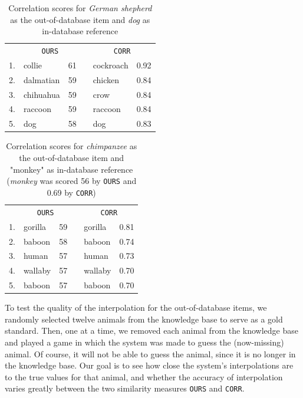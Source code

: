 \documentclass[11pt,a4paper]{article}
\begin{document}
\begin{table}[h]
    \centering
    \begin{tabular}{clcclc}
    \toprule
    & \multicolumn{2}{c}{\texttt{OURS}} && \multicolumn{2}{c}{\texttt{CORR}} \\
    \cmidrule{2-3} \cmidrule{5-6}
    1. & collie & 61 && cockroach & 0.92 \\
    2. & dalmatian & 59 && chicken & 0.84 \\
    3. & chihuahua & 59 && crow & 0.84 \\
    4. & raccoon & 59 && raccoon & 0.84 \\
    5. & dog & 58 && dog & 0.83 \\
    \bottomrule
    \end{tabular}
\caption{Correlation scores for \textit{German shepherd} as the out-of-database item and \textit{dog} as in-database reference}
\label{tab:corr1}
\end{table}

\begin{table}[h]
    \centering
    \begin{tabular}{clcclc}
    \toprule
    & \multicolumn{2}{c}{\texttt{OURS}} && \multicolumn{2}{c}{\texttt{CORR}} \\
    \cmidrule{2-3} \cmidrule{5-6}
    1. & gorilla & 59 && gorilla & 0.81 \\
    2. & baboon & 58 && baboon & 0.74 \\
    3. & human & 57 && human & 0.73 \\
    4. & wallaby & 57 && wallaby & 0.70 \\
    5. & baboon & 57 && baboon & 0.70 \\
    \bottomrule
    \end{tabular}
\caption{Correlation scores for \textit{chimpanzee} as the out-of-database item and "monkey" as in-database reference (\textit{monkey} was scored 56 by \texttt{OURS} and 0.69 by \texttt{CORR})}
\label{tab:corr2}
\end{table}


To test the quality of the interpolation for the out-of-database items, we randomly selected twelve animals from the knowledge base to serve as a gold standard.
Then, one at a time, we removed each animal from the knowledge base and played a game in which the system was made to guess the (now-missing) animal. 
Of course, it will not be able to guess the animal, since it is no longer in the knowledge base.
Our goal is to see how close the system's interpolations are to the true values for that animal, and whether the accuracy of interpolation varies greatly between the two similarity measures \texttt{OURS} and \texttt{CORR}.
\end{document}
